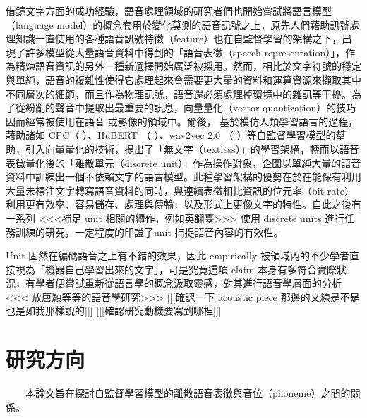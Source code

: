     借鏡文字方面的成功經驗，語音處理領域的研究者們也開始嘗試將語言模型（language model）的概念套用於變化莫測的語音訊號之上，原先人們藉助訊號處理知識一直使用的各種語音訊號特徵（feature）也在自監督學習的架構之下，出現了許多模型從大量語音資料中得到的「語音表徵（speech representation）」，作為精煉語音資訊的另外一種新選擇開始廣泛被採用。然而，相比於文字符號的穩定與單純，語音的複雜性使得它處理起來會需要更大量的資料和運算資源來擷取其中不同層次的細節，而且作為物理訊號，語音還必須處理掉環境中的雜訊等干擾。為了從紛亂的聲音中提取出最重要的訊息，向量量化（vector quantization）的技巧因而經常被使用在語音 \cite{chorowski2019unsupervised, chen2023vector, zhao2023speech} 或影像的領域中。爾後， \cite{lakhotia2021generative}  基於模仿人類學習語言的過程，藉助諸如 CPC（\cite{oord2019representation} ）、HuBERT （\cite{hsu2021hubert} ）、wav2vec 2.0 （\cite{baevski2020wav2vec} ）等自監督學習模型的幫助，引入向量量化的技術，提出了「無文字（textless）」的學習架構，轉而以語音表徵量化後的「離散單元（discrete unit）」作為操作對象，企圖以單純大量的語音資料中訓練出一個不依賴文字的語言模型。此種學習架構的優勢在於在能保有利用大量未標注文字轉寫語音資料的同時，與連續表徵相比資訊的位元率（bit rate）利用更有效率、容易儲存、處理與傳輸，以及形式上更像文字的特性。自此之後有一系列  <<<補足 unit 相關的續作，例如英翻臺>>> 使用 discrete units 進行任務訓練的研究，一定程度的印證了unit 捕捉語音內容的有效性。
    
    Unit 固然在編碼語音之上有不錯的效果，因此 empirically 被領域內的不少學者直接視為「機器自己學習出來的文字」，可是究竟這項 claim 本身有多符合實際狀況，有學者便嘗試重新從語言學的概念汲取靈感，對其進行語音學層面的分析 <<< 放唐顥等等的語音學研究>>>
    [[[確認一下 acoustic piece 那邊的文線是不是也是如我那樣說的]]]
    [[[確認研究動機要寫到哪裡]]]
    
    

\section{研究方向}  %

　　本論文旨在探討自監督學習模型的離散語音表徵與音位（phoneme）之間的關係。




